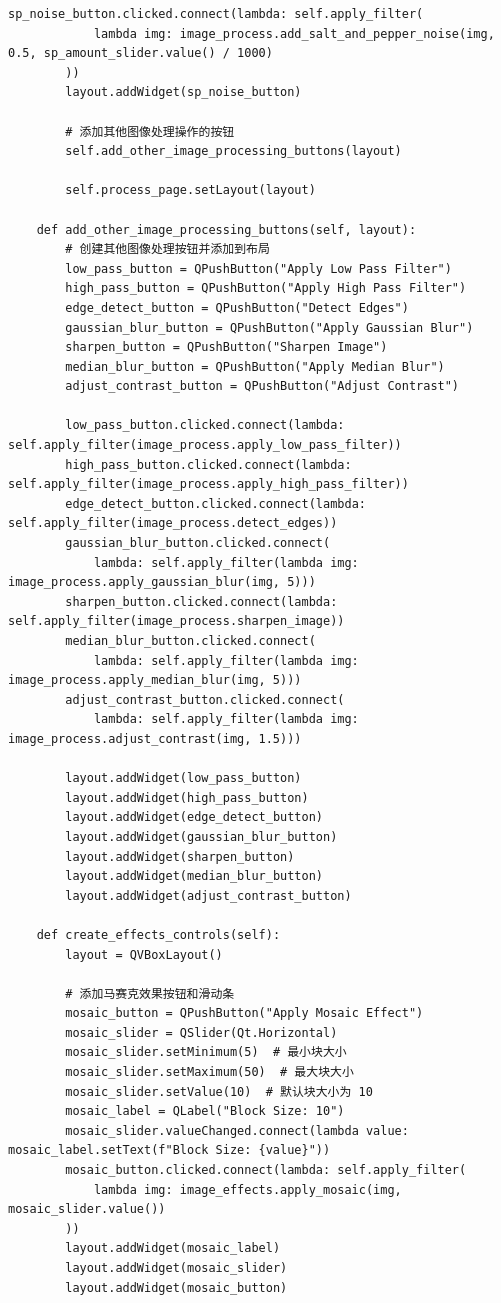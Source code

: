 \documentclass[a4paper,12pt]{article}
\begin{document}
\begin{lstlisting}[style=python]
        sp_noise_button.clicked.connect(lambda: self.apply_filter(
            lambda img: image_process.add_salt_and_pepper_noise(img, 0.5, sp_amount_slider.value() / 1000)
        ))
        layout.addWidget(sp_noise_button)

        # 添加其他图像处理操作的按钮
        self.add_other_image_processing_buttons(layout)

        self.process_page.setLayout(layout)

    def add_other_image_processing_buttons(self, layout):
        # 创建其他图像处理按钮并添加到布局
        low_pass_button = QPushButton("Apply Low Pass Filter")
        high_pass_button = QPushButton("Apply High Pass Filter")
        edge_detect_button = QPushButton("Detect Edges")
        gaussian_blur_button = QPushButton("Apply Gaussian Blur")
        sharpen_button = QPushButton("Sharpen Image")
        median_blur_button = QPushButton("Apply Median Blur")
        adjust_contrast_button = QPushButton("Adjust Contrast")

        low_pass_button.clicked.connect(lambda: self.apply_filter(image_process.apply_low_pass_filter))
        high_pass_button.clicked.connect(lambda: self.apply_filter(image_process.apply_high_pass_filter))
        edge_detect_button.clicked.connect(lambda: self.apply_filter(image_process.detect_edges))
        gaussian_blur_button.clicked.connect(
            lambda: self.apply_filter(lambda img: image_process.apply_gaussian_blur(img, 5)))
        sharpen_button.clicked.connect(lambda: self.apply_filter(image_process.sharpen_image))
        median_blur_button.clicked.connect(
            lambda: self.apply_filter(lambda img: image_process.apply_median_blur(img, 5)))
        adjust_contrast_button.clicked.connect(
            lambda: self.apply_filter(lambda img: image_process.adjust_contrast(img, 1.5)))

        layout.addWidget(low_pass_button)
        layout.addWidget(high_pass_button)
        layout.addWidget(edge_detect_button)
        layout.addWidget(gaussian_blur_button)
        layout.addWidget(sharpen_button)
        layout.addWidget(median_blur_button)
        layout.addWidget(adjust_contrast_button)

    def create_effects_controls(self):
        layout = QVBoxLayout()

        # 添加马赛克效果按钮和滑动条
        mosaic_button = QPushButton("Apply Mosaic Effect")
        mosaic_slider = QSlider(Qt.Horizontal)
        mosaic_slider.setMinimum(5)  # 最小块大小
        mosaic_slider.setMaximum(50)  # 最大块大小
        mosaic_slider.setValue(10)  # 默认块大小为 10
        mosaic_label = QLabel("Block Size: 10")
        mosaic_slider.valueChanged.connect(lambda value: mosaic_label.setText(f"Block Size: {value}"))
        mosaic_button.clicked.connect(lambda: self.apply_filter(
            lambda img: image_effects.apply_mosaic(img, mosaic_slider.value())
        ))
        layout.addWidget(mosaic_label)
        layout.addWidget(mosaic_slider)
        layout.addWidget(mosaic_button)


\end{lstlisting}
\end{document}
